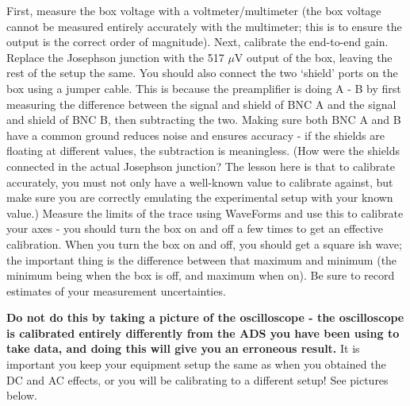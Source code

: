 \documentclass{../lab}
\begin{document}
First, measure the box voltage with a voltmeter/multimeter (the box voltage cannot be measured entirely accurately with the multimeter; this is to ensure the output is the correct order of magnitude). Next, calibrate the end-to-end gain. Replace the Josephson junction with the 517 $\mu$V output of the box, leaving the rest of the setup the same. You should also connect the two `shield' ports on the box using a jumper cable. This is because the preamplifier is doing A - B by first measuring the difference between the signal and shield of BNC A and the signal and shield of BNC B, then subtracting the two. Making sure both BNC A and B have a common ground reduces noise and ensures accuracy - if the shields are floating at different values, the subtraction is meaningless. (How were the shields connected in the actual Josephson junction? The lesson here is that to calibrate accurately, you must not only have a well-known value to calibrate against, but make sure you are correctly emulating the experimental setup with your known value.) Measure the limits of the trace using WaveForms and use this to calibrate your axes - you should turn the box on and off a few times to get an effective calibration. When you turn the box on and off, you should get a square ish wave; the important thing is the difference between that maximum and minimum (the minimum being when the box is off, and maximum when on). Be sure to record estimates of your measurement uncertainties.

\textbf{Do not do this by taking a picture of the oscilloscope - the oscilloscope is calibrated entirely differently from the ADS you have been using to take data, and doing this will give you an erroneous result.} It is important you keep your equipment setup the same as when you obtained the DC and AC effects, or you will be calibrating to a different setup! See pictures below.




\end{document}

